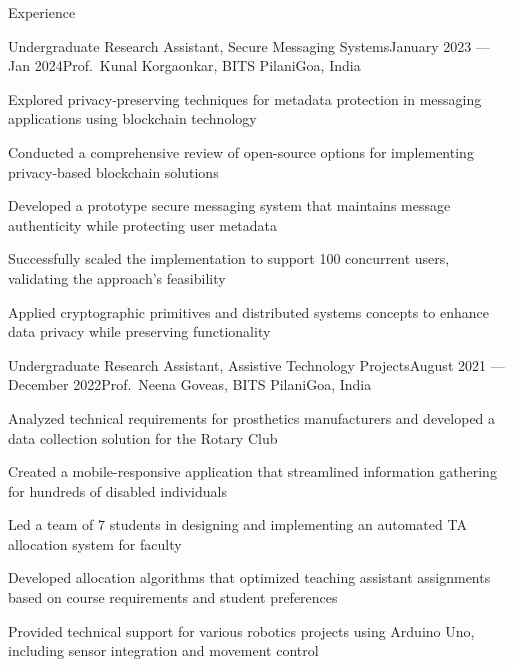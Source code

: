
\begin{rSection}{Experience}

    \begin{rSubsection}{Undergraduate Research Assistant, Secure Messaging Systems}{January 2023 --- Jan 2024}{Prof.\ Kunal Korgaonkar, BITS Pilani}{Goa, India}
        \item Explored privacy-preserving techniques for metadata protection in messaging applications using blockchain technology
        \item Conducted a comprehensive review of open-source options for implementing privacy-based blockchain solutions
        \item Developed a prototype secure messaging system that maintains message authenticity while protecting user metadata
        \item Successfully scaled the implementation to support 100 concurrent users, validating the approach's feasibility
        \item Applied cryptographic primitives and distributed systems concepts to enhance data privacy while preserving functionality
    \end{rSubsection}
    
    \begin{rSubsection}{Undergraduate Research Assistant, Assistive Technology Projects}{August 2021 --- December 2022}{Prof.\ Neena Goveas, BITS Pilani}{Goa, India}
        \item Analyzed technical requirements for prosthetics manufacturers and developed a data collection solution for the Rotary Club
        \item Created a mobile-responsive application that streamlined information gathering for hundreds of disabled individuals
        \item Led a team of 7 students in designing and implementing an automated TA allocation system for faculty
        \item Developed allocation algorithms that optimized teaching assistant assignments based on course requirements and student preferences
        \item Provided technical support for various robotics projects using Arduino Uno, including sensor integration and movement control
    \end{rSubsection}
    
    \end{rSection}